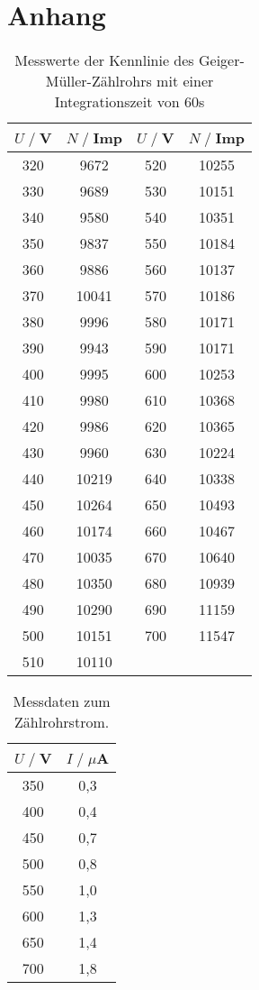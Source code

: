 \newpage
\section{Anhang}

\begin{table}[H]
    \centering
    \begin{tabular}{c c ||c c}
        \toprule
        $U\;/\;$V & $N\;/\;$Imp & $U\;/\;$V & $N\;/\;$Imp\\
        \midrule
        320	&9672& 520&	10255\\
        330	&9689& 530&	10151\\
        340	&9580& 540&	10351\\
        350	&9837& 550&	10184\\
        360	&9886& 560&	10137\\
        370	&10041& 570&	10186\\
        380	&9996& 580&	10171\\
        390	&9943& 590&	10171\\
        400	&9995& 600&	10253\\
        410	&9980& 610&	10368\\
        420	&9986& 620&	10365\\
        430	&9960& 630&	10224\\
        440	&10219& 640&	10338\\
        450	&10264& 650&	10493\\
        460	&10174& 660&	10467\\
        470	&10035& 670&	10640\\
        480	&10350& 680&	10939\\
        490	&10290& 690&	11159\\
        500	&10151& 700&	11547\\
        510	&10110&&\\
        \bottomrule
    \end{tabular}
    \caption{Messwerte der Kennlinie des Geiger-Müller-Zählrohrs mit
    einer Integrationszeit von $60$s}
\end{table}

\begin{table}[H]
    \centering
    \begin{tabular}{c c}
        \toprule
        $U\;/\;$V & $I\;/\;\mu$A\\
        \midrule
        350&       0,3\\
        400&	   0,4\\
        450&	   0,7\\
        500&	   0,8\\
        550&	   1,0\\
        600&	   1,3\\
        650&	   1,4\\
        700&	   1,8\\
        \bottomrule
    \end{tabular}
    \caption{Messdaten zum Zählrohrstrom.}
\end{table}
\label{sec:anhang}
